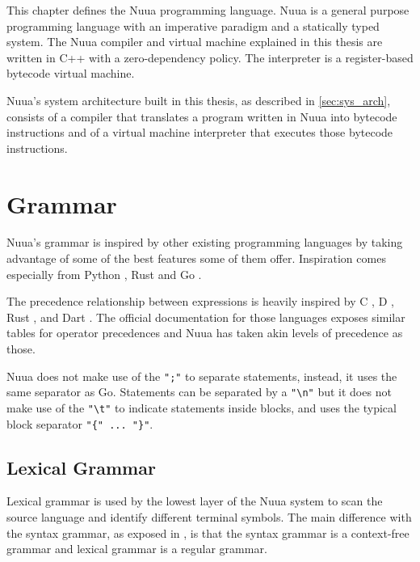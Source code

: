 This chapter defines the Nuua programming language. Nuua is a general purpose programming language with an imperative
paradigm and a statically typed system. The Nuua compiler and virtual machine explained in this thesis are written in C++
with a zero-dependency policy. The interpreter is a register-based bytecode virtual machine.

Nuua's system architecture built in this thesis, as described in \autoref{sec:sys_arch}, consists of a compiler that translates a program written
in Nuua into bytecode instructions and of a virtual machine interpreter that executes those bytecode instructions.

\section{Grammar}

Nuua's grammar is inspired by other existing programming languages by taking advantage of some of the best features some of them offer.
Inspiration comes especially from Python \autocite{python_programming_language}, Rust \autocite{rust_programming_language} and
Go \autocite{go_programming_language}.

The precedence relationship between expressions is heavily inspired by C \autocite{c_programming_language}, D \autocite{d_programming_language},
Rust \autocite{rust_programming_language}, and Dart \autocite{dart_programming_language}. The official documentation for those languages
exposes similar tables for operator precedences and Nuua has taken akin levels of precedence as those.

Nuua does not make use of the \texttt{";"} to separate statements, instead, it uses the same separator as Go. Statements can be separated by
a \texttt{"\textbackslash n"} but it does not make use of the \texttt{"\textbackslash t"} to indicate statements inside blocks, and uses the typical
block separator \texttt{"\{" ... "\}"}.

\subsection{Lexical Grammar}

Lexical grammar is used by the lowest layer of the Nuua system to scan the source language and identify different terminal symbols.
The main difference with the syntax grammar, as exposed in \autocite[Appendix~I]{crafting_interpreters}, is that the syntax grammar is a context-free grammar and lexical grammar is a regular grammar.

